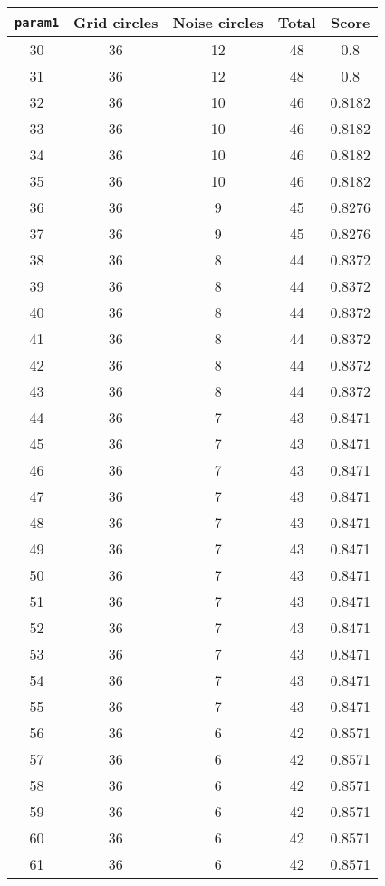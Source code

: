\documentclass[letterpaper, 12pt]{article}
\begin{document}
\begin{longtable}{|c|c|c|c|c|}
\hline
\textbf{\texttt{param1}} & \textbf{Grid circles} & \textbf{Noise circles} & \textbf{Total} & \textbf{Score} \\
\hline
30 & 36 & 12 & 48 & 0.8 \\
\hline
31 & 36 & 12 & 48 & 0.8 \\
\hline
32 & 36 & 10 & 46 & 0.8182 \\
\hline
33 & 36 & 10 & 46 & 0.8182 \\
\hline
34 & 36 & 10 & 46 & 0.8182 \\
\hline
35 & 36 & 10 & 46 & 0.8182 \\
\hline
36 & 36 & 9 & 45 & 0.8276 \\
\hline
37 & 36 & 9 & 45 & 0.8276 \\
\hline
38 & 36 & 8 & 44 & 0.8372 \\
\hline
39 & 36 & 8 & 44 & 0.8372 \\
\hline
40 & 36 & 8 & 44 & 0.8372 \\
\hline
41 & 36 & 8 & 44 & 0.8372 \\
\hline
42 & 36 & 8 & 44 & 0.8372 \\
\hline
43 & 36 & 8 & 44 & 0.8372 \\
\hline
44 & 36 & 7 & 43 & 0.8471 \\
\hline
45 & 36 & 7 & 43 & 0.8471 \\
\hline
46 & 36 & 7 & 43 & 0.8471 \\
\hline
47 & 36 & 7 & 43 & 0.8471 \\
\hline
48 & 36 & 7 & 43 & 0.8471 \\
\hline
49 & 36 & 7 & 43 & 0.8471 \\
\hline
50 & 36 & 7 & 43 & 0.8471 \\
\hline
51 & 36 & 7 & 43 & 0.8471 \\
\hline
52 & 36 & 7 & 43 & 0.8471 \\
\hline
53 & 36 & 7 & 43 & 0.8471 \\
\hline
54 & 36 & 7 & 43 & 0.8471 \\
\hline
55 & 36 & 7 & 43 & 0.8471 \\
\hline
56 & 36 & 6 & 42 & 0.8571 \\
\hline
57 & 36 & 6 & 42 & 0.8571 \\
\hline
58 & 36 & 6 & 42 & 0.8571 \\
\hline
59 & 36 & 6 & 42 & 0.8571 \\
\hline
60 & 36 & 6 & 42 & 0.8571 \\
\hline
61 & 36 & 6 & 42 & 0.8571 \\

\end{longtable}
\end{document}
